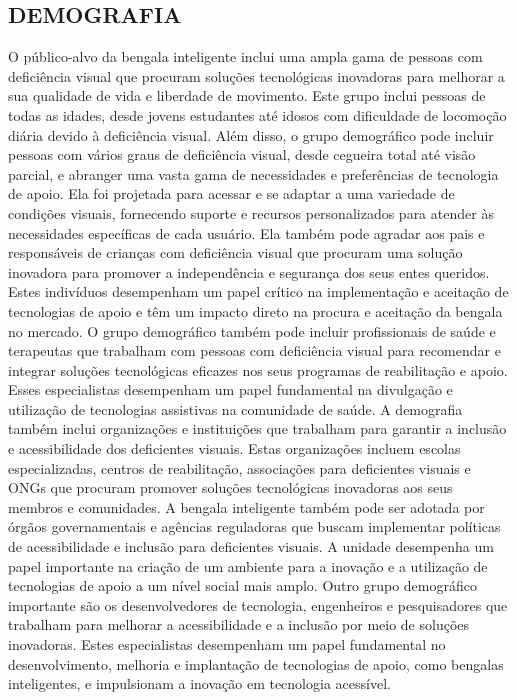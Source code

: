 \subsection{DEMOGRAFIA}
O público-alvo da bengala inteligente inclui uma ampla gama de pessoas com deficiência visual que procuram soluções tecnológicas inovadoras para melhorar a sua qualidade de vida e liberdade de movimento. Este grupo inclui pessoas de todas as idades, desde jovens estudantes até idosos com dificuldade de locomoção diária devido à deficiência visual.
Além disso, o grupo demográfico pode incluir pessoas com vários graus de deficiência visual, desde cegueira total até visão parcial, e abranger uma vasta gama de necessidades e preferências de tecnologia de apoio. Ela foi projetada para acessar e se adaptar a uma variedade de condições visuais, fornecendo suporte e recursos personalizados para atender às necessidades específicas de cada usuário.
Ela também pode agradar aos pais e responsáveis de crianças com deficiência visual que procuram uma solução inovadora para promover a independência e segurança dos seus entes queridos. Estes indivíduos desempenham um papel crítico na implementação e aceitação de tecnologias de apoio e têm um impacto direto na procura e aceitação da bengala no mercado.
O grupo demográfico também pode incluir profissionais de saúde e terapeutas que trabalham com pessoas com deficiência visual para recomendar e integrar soluções tecnológicas eficazes nos seus programas de reabilitação e apoio. Esses especialistas desempenham um papel fundamental na divulgação e utilização de tecnologias assistivas na comunidade de saúde.
A demografia também inclui organizações e instituições que trabalham para garantir a inclusão e acessibilidade dos deficientes visuais. Estas organizações incluem escolas especializadas, centros de reabilitação, associações para deficientes visuais e ONGs que procuram promover soluções tecnológicas inovadoras aos seus membros e comunidades.
A bengala inteligente também pode ser adotada por órgãos governamentais e agências reguladoras que buscam implementar políticas de acessibilidade e inclusão para deficientes visuais. A unidade desempenha um papel importante na criação de um ambiente para a inovação e a utilização de tecnologias de apoio a um nível social mais amplo.
Outro grupo demográfico importante são os desenvolvedores de tecnologia, engenheiros e pesquisadores que trabalham para melhorar a acessibilidade e a inclusão por meio de soluções inovadoras. Estes especialistas desempenham um papel fundamental no desenvolvimento, melhoria e implantação de tecnologias de apoio, como bengalas inteligentes, e impulsionam a inovação em tecnologia acessível.

